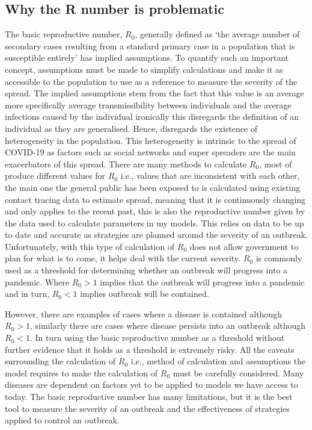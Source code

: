 \documentclass[11pt]{article}
\begin{document}
\subsection{Why the R number is problematic}
The basic reproductive number, $R_0$, generally defined as ‘the average number of secondary cases resulting from a standard primary case in a population that is susceptible entirely’ has implied assumptions. To quantify such an important concept, assumptions must be made to simplify calculations and make it as accessible to the population to use as a reference to measure the severity of the spread. The implied assumptions stem from the fact that this value is an average more specifically average transmissibility between individuals and the average infections caused by the individual ironically this disregards the definition of an individual as they are generalised. Hence, disregards the existence of heterogeneity in the population. This heterogeneity is intrinsic to the spread of COVID-19 as factors such as social networks and super spreaders are the main exacerbators of this spread.
There are many methods to calculate $R_0$, most of produce different values for $R_0$ i.e., values that are inconsistent with each other\citep{breban2007theory}, the main one the general public has been exposed to is calculated using existing contact tracing data to estimate spread\citep{R0calculationBBC}, meaning that it is continuously changing and only applies to the recent past, this is also the reproductive number given by the data used to calculate parameters in my models. This relies on data to be up to date and accurate as strategies are planned around the severity of an outbreak. Unfortunately, with this type of calculation of $R_0$ does not allow government to plan for what is to come, it helps deal with the current severity.
$R_0$ is commonly used as a threshold for determining whether an outbreak will progress into a pandemic. Where $R_0>1$ implies that the outbreak will progress into a pandemic and in turn, $R_0<1$ implies outbreak will be contained. \par
However, there are examples of cases where a disease is contained although $R_0>1$, similarly there are cases where disease persists into an outbreak although $R_0<1$\citep{li2011failure}. In turn using the basic reproductive number as a threshold without further evidence that it holds as a threshold is extremely risky. All the caveats surrounding the calculation of $R_0$ i.e., method of calculation and assumptions the model requires to make the calculation of $R_0$ must be carefully considered\citep{li2011failure}. Many diseases are dependent on factors yet to be applied to models we have access to today. The basic reproductive number has many limitations, but it is the best tool to measure the severity of an outbreak and the effectiveness of strategies applied to control an outbreak.
\end{document}
